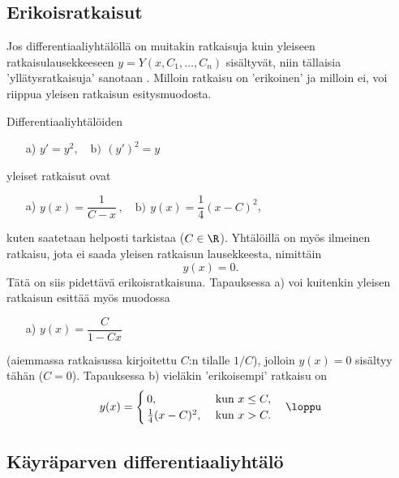 \subsection{Erikoisratkaisut}

Jos differentiaaliyhtälöllä on muitakin ratkaisuja kuin yleiseen ratkaisulausekkeeseen 
$y=Y(x,C_1,\ldots,C_n)$ sisältyvät, niin tällaisia 'yllätysratkaisuja' sanotaan 
. Milloin ratkaisu on 'erikoinen' ja milloin ei, voi riippua
yleisen ratkaisun esitysmuodosta.
\begin{Exa} \label{erikoinen dy}
Differentiaaliyhtälöiden
\begin{itemize}
\item[a)] $y'=y^2,\quad \text{b)}\,\ (y')^2=y$
\end{itemize}
yleiset ratkaisut ovat
\begin{itemize}
\item[a)] $y(x)=\dfrac{1}{C-x}\,,\quad \text{b)}\,\ y(x)=\dfrac{1}{4}(x-C)^2$,
\end{itemize}
kuten saatetaan helposti tarkistaa ($C\in\R$). Yhtälöillä on myös ilmeinen ratkaisu,
jota ei saada yleisen ratkaisun lausekkeesta, nimittäin
\[
y(x)=0.
\]
Tätä on siis pidettävä erikoisratkaisuna. Tapauksessa a) voi kuitenkin yleisen ratkaisun
esittää myös muodossa
\begin{itemize}
\item[a)] $y(x)=\dfrac{C}{1-Cx}$
\end{itemize}
(aiemmassa ratkaisussa kirjoitettu $C$:n tilalle $1/C$), jolloin $y(x)=0$ sisältyy tähän
($C=0$). Tapauksessa b) vieläkin 'erikoisempi' ratkaisu on
\[
y(x)=\begin{cases}
\,0,                  &\text{ kun } x\leq C, \\
\,\frac{1}{4}(x-C)^2, &\text{ kun } x>C.
\end{cases} \quad\loppu
\]
\end{Exa}

\subsection{Käyräparven differentiaaliyhtälö}

